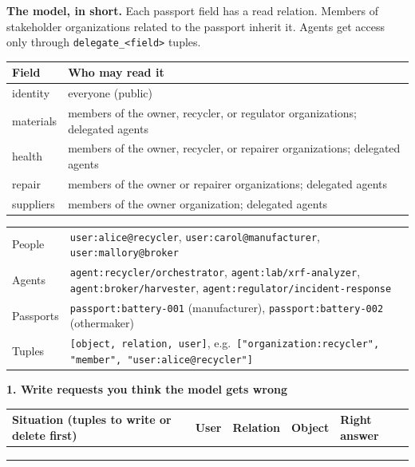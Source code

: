 \documentclass[10pt]{article}
\begin{document}

\textbf{The model, in short.} Each passport field has a read relation. Members of stakeholder organizations related to the passport inherit it. Agents get access only through \texttt{delegate\_<field>} tuples.

\begin{tabularx}{\textwidth}{@{}l X@{}}
\toprule
\textbf{Field} & \textbf{Who may read it} \\
\midrule
identity & everyone (public) \\
materials & members of the owner, recycler, or regulator organizations; delegated agents \\
health & members of the owner, recycler, or repairer organizations; delegated agents \\
repair & members of the owner or repairer organizations; delegated agents \\
suppliers & members of the owner organization; delegated agents \\
\bottomrule
\end{tabularx}

\medskip
\begin{tabularx}{\textwidth}{@{}l >{\raggedright\arraybackslash}X@{}}
People & \texttt{user:alice@recycler}, \texttt{user:carol@manufacturer}, \texttt{user:mallory@broker} \\
Agents & \texttt{agent:recycler/orchestrator}, \texttt{agent:lab/xrf-analyzer}, \texttt{agent:broker/harvester}, \texttt{agent:regulator/incident-response} \\
Passports & \texttt{passport:battery-001} (manufacturer), \texttt{passport:battery-002} (othermaker) \\
Tuples & \texttt{[object, relation, user]}, e.g.\ \texttt{["organization:recycler", "member", "user:alice@recycler"]} \\
\end{tabularx}

\bigskip
\textbf{1. Write requests you think the model gets wrong}

\renewcommand{\arraystretch}{2.6}
\begin{tabularx}{\textwidth}{@{}>{\raggedright\arraybackslash}X L{2.4cm} L{3cm} L{2.6cm} L{1.6cm}@{}}
\toprule
\textbf{Situation (tuples to write or delete first)} & \textbf{User} & \textbf{Relation} & \textbf{Object} & \textbf{Right answer} \\
\midrule
 & & & & \\
 & & & & \\
 & & & & \\
\bottomrule
\end{tabularx}
\renewcommand{\arraystretch}{1}
\end{document}
